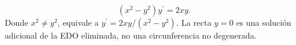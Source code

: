 \[(x^2-y^2)y^{\prime}=2xy.\] Donde $x^2\ne y^2$, equivale a $y^{\prime}=2xy/(x^2-y^2)$. La recta $y=0$ es una solución adicional de la EDO eliminada, no una circunferencia no degenerada.
